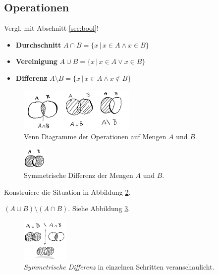 \subsection{Operationen}

Vergl. mit Abschnitt \ref{sec:bool}!

\begin{itemize}
    \item \textbf{Durchschnitt} $ A \cap B = \{x \, | \, x \in A \land x \in B\}$
    \item \textbf{Vereinigung} $ A \cup B = \{x \, | \, x \in A \lor x \in B\}$
    \item \textbf{Differenz} $ A \setminus B = \{x \, | \, x \in A \land x \notin B\}$
\end{itemize}


\begin{figure}[h]
    \centering
    \includegraphics[width=0.5\textwidth]{img/mengenVenn.png}
    \caption{Venn Diagramme der Operationen auf Mengen $A$ und $B$.}
    \label{fig:vennMengen}
\end{figure}



\begin{figure}[h]
    \centering
    \includegraphics[width=0.1\textwidth]{img/mengen_symDiff.png}
    \caption{Symmetrische Differenz der Mengen $A$ und $B$.}
    \label{fig:venn_symDiff}
\end{figure}

\begin{question}
    Konstruiere die Situation in Abbildung \ref{fig:venn_symDiff}.
\end{question}

\begin{answer}
      $(A \cup B) \setminus (A \cap B)$. Siehe Abbildung \ref{fig:symDifSteps}.
\end{answer}

      \begin{figure}[h]
          \centering
          \includegraphics[width=0.2\textwidth]{img/symDifSteps.png}
          \caption{\emph{Symmetrische Differenz} in einzelnen Schritten veranschaulicht.}
          \label{fig:symDifSteps}
      \end{figure}


